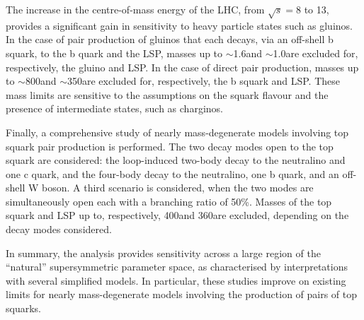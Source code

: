 The increase in the centre-of-mass energy of the LHC, from $\sqrt{s} =
8$ to 13\TeV, provides a significant gain in sensitivity to heavy
particle states such as gluinos. In the case of pair production of
gluinos that each decays, via an off-shell b squark, to the b quark
and the LSP, masses up to $\sim$1.6\TeV and $\sim$1.0\TeV are excluded
for, respectively, the gluino and LSP. In the case of direct pair
production, masses up to $\sim$800\GeV and $\sim$350\GeV are excluded
for, respectively, the b squark and LSP. These mass limits are
sensitive to the assumptions on the squark flavour and the presence of
intermediate states, such as charginos.

Finally, a comprehensive study of nearly mass-degenerate models
involving top squark pair production is performed. The two decay modes
open to the top squark are considered: the loop-induced two-body decay
to the neutralino and one c quark, and the four-body decay to the
neutralino, one b quark, and an off-shell W boson. A third scenario is
considered, when the two modes are simultaneously open each with a
branching ratio of 50\%. Masses of the top squark and LSP up to,
respectively, 400\GeV and 360\GeV are excluded, depending on the decay
modes considered.

In summary, the analysis provides sensitivity across a large region of
the ``natural'' supersymmetric parameter space, as characterised by
interpretations with several simplified models. In particular, these
studies improve on existing limits for nearly mass-degenerate models
involving the production of pairs of top squarks.
